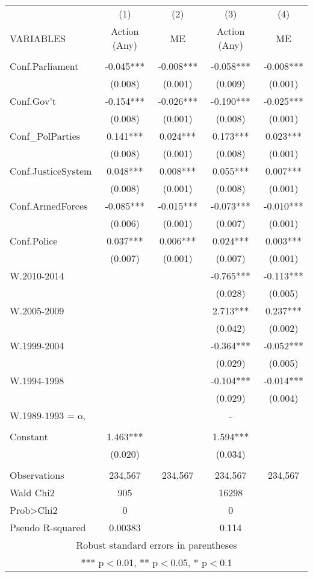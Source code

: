 \documentclass[]{article}
\begin{document}
\begin{tabular}{lcccc} \hline
 & (1) & (2) & (3) & (4) \\
VARIABLES & Action (Any) & ME & Action (Any) & ME \\ \hline
 &  &  &  &  \\
Conf.Parliament & -0.045*** & -0.008*** & -0.058*** & -0.008*** \\
 & (0.008) & (0.001) & (0.009) & (0.001) \\
Conf.Gov't & -0.154*** & -0.026*** & -0.190*** & -0.025*** \\
 & (0.008) & (0.001) & (0.008) & (0.001) \\
Conf\_PolParties & 0.141*** & 0.024*** & 0.173*** & 0.023*** \\
 & (0.008) & (0.001) & (0.008) & (0.001) \\
Conf.JusticeSystem & 0.048*** & 0.008*** & 0.055*** & 0.007*** \\
 & (0.008) & (0.001) & (0.008) & (0.001) \\
Conf.ArmedForces & -0.085*** & -0.015*** & -0.073*** & -0.010*** \\
 & (0.006) & (0.001) & (0.007) & (0.001) \\
Conf.Police & 0.037*** & 0.006*** & 0.024*** & 0.003*** \\
 & (0.007) & (0.001) & (0.007) & (0.001) \\
W.2010-2014 &  &  & -0.765*** & -0.113*** \\
 &  &  & (0.028) & (0.005) \\
W.2005-2009 &  &  & 2.713*** & 0.237*** \\
 &  &  & (0.042) & (0.002) \\
W.1999-2004 &  &  & -0.364*** & -0.052*** \\
 &  &  & (0.029) & (0.005) \\
W.1994-1998 &  &  & -0.104*** & -0.014*** \\
 &  &  & (0.029) & (0.004) \\
W.1989-1993 = o, &  &  & - &  \\
 &  &  &  &  \\
Constant & 1.463*** &  & 1.594*** &  \\
 & (0.020) &  & (0.034) &  \\
 &  &  &  &  \\
Observations & 234,567 & 234,567 & 234,567 & 234,567 \\
Wald Chi2 & 905 &  & 16298 &  \\
Prob>Chi2 & 0 &  & 0 &  \\
 Pseudo R-squared & 0.00383 &  & 0.114 &  \\ \hline
\multicolumn{5}{c}{ Robust standard errors in parentheses} \\
\multicolumn{5}{c}{ *** p$<$0.01, ** p$<$0.05, * p$<$0.1} \\
\end{tabular}
\end{document}
